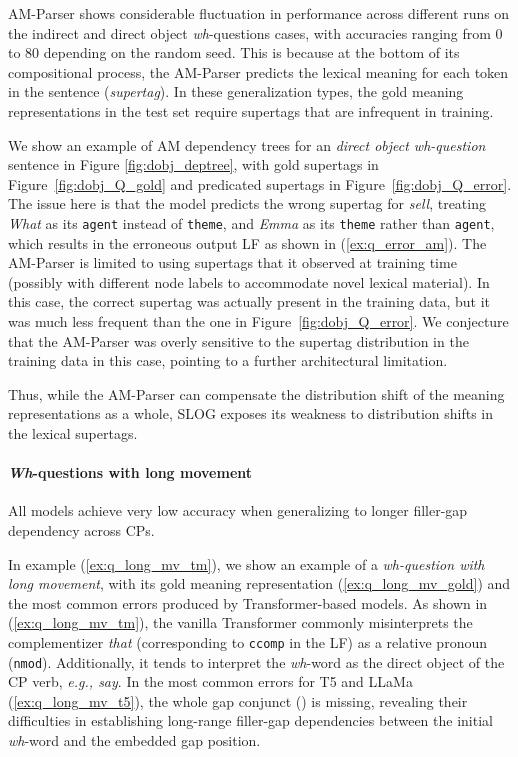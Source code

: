 AM-Parser shows considerable fluctuation in performance across different runs on the indirect and direct object \textit{wh}-questions cases, with accuracies ranging from 0 to 80 depending on the random seed. This is because at the bottom of its compositional process, the AM-Parser predicts the lexical meaning for each token in the sentence (\textit{supertag}). In these generalization types, the gold meaning representations in the test set require supertags that are infrequent in training. 

We show an example of AM dependency trees for an \textit{direct object wh-question} sentence in Figure \ref{fig:dobj_deptree}, with gold supertags in Figure~\ref{fig:dobj_Q_gold} and predicated supertags in Figure~\ref{fig:dobj_Q_error}. The issue here is that the model predicts the wrong supertag for \emph{sell}, treating \emph{What} as its \texttt{agent} instead of \texttt{theme}, and \emph{Emma} as its \texttt{theme} rather than \texttt{agent}, which results in the erroneous output LF as shown in (\ref{ex:q_error_am}). The AM-Parser is limited to using supertags that it observed at training time (possibly with different node labels to accommodate novel lexical material). In this case, the correct supertag was actually present in the training data, but it was much less frequent than the one in Figure~\ref{fig:dobj_Q_error}. We conjecture that the AM-Parser was overly sensitive to the supertag distribution in the training data in this case, pointing to a further architectural limitation. 

Thus, while the AM-Parser can compensate the distribution shift of the meaning representations as a whole, SLOG exposes its weakness to distribution shifts in the lexical supertags. 





\paragraph{\textit{Wh}-questions with long movement} 
All models achieve very low accuracy when generalizing to longer filler-gap dependency across CPs.

In example (\ref{ex:q_long_mv_tm}), we show an example of a \textit{wh-question with long movement}, with its gold meaning representation (\ref{ex:q_long_mv_gold}) and the most common errors produced by Transformer-based models. As shown in (\ref{ex:q_long_mv_tm}), the vanilla Transformer commonly misinterprets the complementizer \textit{that} (corresponding to \texttt{ccomp} in the LF) as a relative pronoun (\texttt{nmod}). Additionally, it tends to interpret the \emph{wh}-word as the direct object of the CP verb, \emph{e.g., say}. In the most common errors for T5 and LLaMa (\ref{ex:q_long_mv_t5}), the whole gap conjunct () is missing, revealing their difficulties in establishing long-range filler-gap dependencies between the initial \emph{wh}-word and the embedded gap position. 
 
